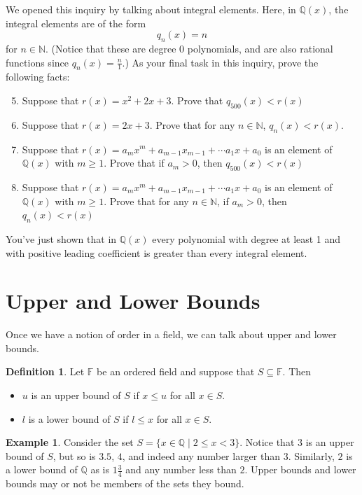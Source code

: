 \documentclass[11pt]{article}
\newenvironment{task}
	{\begin{mdframed}[linecolor=lightgray, linewidth=3pt]\raggedright}
	{\end{mdframed}}
\theoremstyle{definition}
\newtheorem{definition}[theorem]{Definition}
\newtheorem{example}[theorem]{Example}
\begin{document}
\begin{task}
We opened this inquiry by talking about integral elements. Here, in $\mathbb{Q}(x)$, the integral elements are of the form
\[ q_n(x) = n \]
for $n\in\mathbb{N}$. (Notice that these are degree 0 polynomials, and are also rational functions since $q_n(x) = \frac{n}{1}$.) As your final task in
this inquiry, prove the following facts:

\begin{enumerate}
    \setcounter{enumi}{4}
  \item Suppose that $r(x) =  x^2 + 2x + 3$. Prove that $q_{500}(x) < r(x)$
  \item Suppose that $r(x) =  2x + 3$. Prove that for any $n\in\mathbb{N}$, $q_n(x) < r(x)$.
  \item Suppose that $r(x) =  a_mx^m + a_{m-1}x_{m-1}+\cdots a_1x + a_0$ is an element
    of $\mathbb{Q}(x)$ with $m \geq 1$. Prove that if $a_m > 0$, then $q_{500}(x) < r(x)$
  \item Suppose that $r(x) =  a_mx^m + a_{m-1}x_{m-1}+\cdots a_1x + a_0$ is an element
    of $\mathbb{Q}(x)$ with $m \geq 1$. Prove that for any $n\in\mathbb{N}$, if $a_m > 0$, then $q_{n}(x) < r(x)$
\end{enumerate}

You've just shown that in $\mathbb{Q}(x)$ every polynomial with degree at least 1 and with positive leading coefficient is greater than every integral
element. 
\end{task}

\section{Upper and Lower Bounds}

Once we have a notion of order in a field, we can talk about upper and lower bounds.

\begin{definition}
  Let $\mathbb{F}$ be an ordered field and suppose that $S\subseteq \mathbb{F}$. Then
  \begin{itemize}
    \item $u$ is an upper bound of $S$ if $x \leq u$ for all $x\in S$.
    \item $l$ is a lower bound of $S$ if $l \leq x$ for all $x\in S$.
  \end{itemize}
\end{definition}

\begin{example}
  Consider the set $S = \{ x \in \mathbb{Q} \mid 2 \leq x < 3 \}$. Notice that
  $3$ is an upper bound of $S$, but so is $3.5$, $4$, and indeed any number larger
  than $3$. Similarly, $2$ is a lower bound of $\mathbb{Q}$ as is $1\frac{3}{4}$ and
  any number less than $2$. Upper bounds and lower bounds may or not be members of
  the sets they bound.
\end{example}
\end{document}
